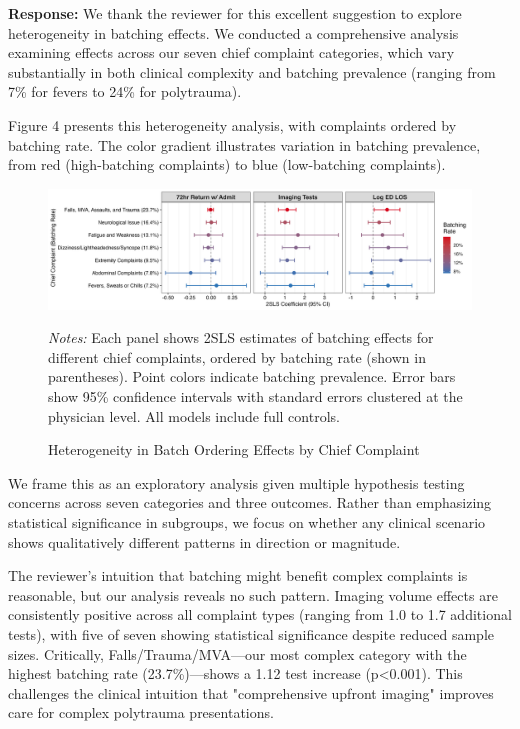 \documentclass[11pt]{article}
\newcommand{\1}{\hbox{\rm 1\kern-.35em 1}}
\begin{document}
\noindent\textbf{Response:} \color{blue}We thank the reviewer for this excellent suggestion to explore heterogeneity in batching effects. We conducted a comprehensive analysis examining effects across our seven chief complaint categories, which vary substantially in both clinical complexity and batching prevalence (ranging from 7\% for fevers to 24\% for polytrauma). 

Figure 4 presents this heterogeneity analysis, with complaints ordered by batching rate. The color gradient illustrates variation in batching prevalence, from red (high-batching complaints) to blue (low-batching complaints).

\begin{figure}[H]
\centering
\caption*{Heterogeneity in Batch Ordering Effects by Chief Complaint}
\begin{threeparttable}
\includegraphics[width=\textwidth]{../outputs/figures/heterogeneity_by_complaint.png}    
\begin{tablenotes}
\small
\item \textit{Notes:} Each panel shows 2SLS estimates of batching effects for different chief complaints, ordered by batching rate (shown in parentheses). Point colors indicate batching prevalence. Error bars show 95\% confidence intervals with standard errors clustered at the physician level. All models include full controls.
\end{tablenotes}
\end{threeparttable}
\end{figure}

We frame this as an exploratory analysis given multiple hypothesis testing concerns across seven categories and three outcomes. Rather than emphasizing statistical significance in subgroups, we focus on whether any clinical scenario shows qualitatively different patterns in direction or magnitude.

The reviewer's intuition that batching might benefit complex complaints is reasonable, but our analysis reveals no such pattern. Imaging volume effects are consistently positive across all complaint types (ranging from 1.0 to 1.7 additional tests), with five of seven showing statistical significance despite reduced sample sizes. Critically, Falls/Trauma/MVA—our most complex category with the highest batching rate (23.7\%)—shows a 1.12 test increase (p<0.001). This challenges the clinical intuition that "comprehensive upfront imaging" improves care for complex polytrauma presentations.
\end{document}
